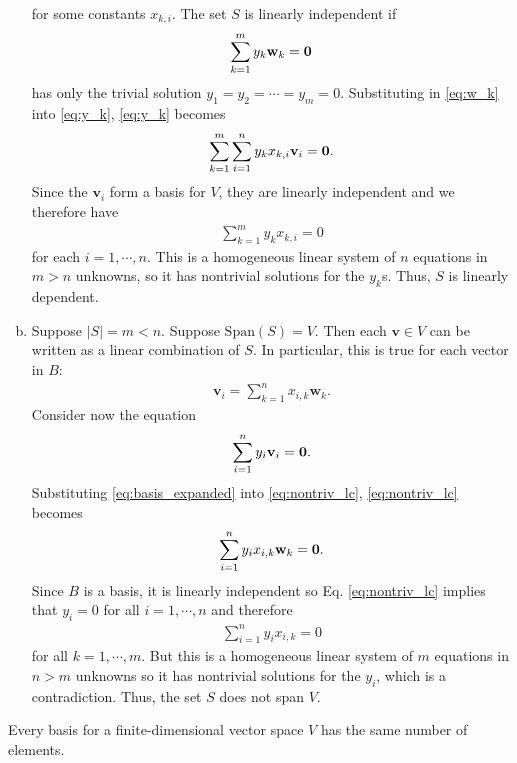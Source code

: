 \documentclass[12pt,letterpaper,reqno]{article}
\numberwithin{equation}{section}
\newcommand{\bv}{\mathbf{v}}
\newcommand{\bw}{\mathbf{w}}
\begin{document}
\begin{pf}
\begin{enumerate}[(a)]
		 for some constants $x_{k,i}$. The set $S$ is linearly independent if  
		\begin{align}\label{eq:y_k}
			\sum_{k=1}^my_k\bw_k={\bf 0}
		\end{align}
		 has only the trivial solution $y_1=y_2=\cdots=y_m=0$. Substituting in \eqref{eq:w_k} into \eqref{eq:y_k}, \eqref{eq:y_k} becomes
		 \begin{align*}
		 	\sum_{k=1}^m\sum_{i=1}^ny_kx_{k,i}\bv_i={\bf 0}.
		 \end{align*}
		Since the $\bv_i$ form a basis for $V$, they are linearly independent and we therefore have
		\begin{align}
			\sum_{k=1}^my_kx_{k,i}=0
		\end{align} 
		for each $i=1,\cdots,n$. This is a homogeneous linear system of $n$ equations in $m>n$ unknowns, so it has nontrivial solutions for the $y_k$s. Thus, $S$ is linearly dependent.
		\item Suppose $|S|=m<n$. Suppose $\text{Span}(S)=V$. Then each $\bv \in V$ can be written as a linear combination of $S$. In particular, this is true for each vector in $B$:
		\begin{align}\label{eq:basis_expanded}
			\bv_i=\sum_{k=1}^nx_{i,k}\bw_k.
		\end{align}
		Consider now the equation 
		\begin{align}\label{eq:nontriv_lc}
			\sum_{i=1}^ny_i\bv_i={\bf 0}.
		\end{align}
		Substituting \eqref{eq:basis_expanded} into \eqref{eq:nontriv_lc}, \eqref{eq:nontriv_lc} becomes
		\begin{align}
			\sum_{i=1}^ny_ix_{i,k}\bw_k={\bf 0}.
		\end{align}
	Since $B$ is a basis, it is linearly independent so Eq. \eqref{eq:nontriv_lc} implies that $y_i=0$ for all $i=1,\cdots, n$ and therefore 
	\begin{align}
		\sum_{i=1}^ny_ix_{i,k}=0
	\end{align}
	for all $k=1,\cdots,m$. But this is a homogeneous linear system of $m$ equations in $n>m$ unknowns so it has nontrivial solutions for the $y_i$, which is a contradiction. Thus, the set $S$ does not span $V$.
	\end{enumerate}
\end{pf}

\begin{cor}
	Every basis for a finite-dimensional vector space $V$ has the same number of elements.
\end{cor}
\end{document}
